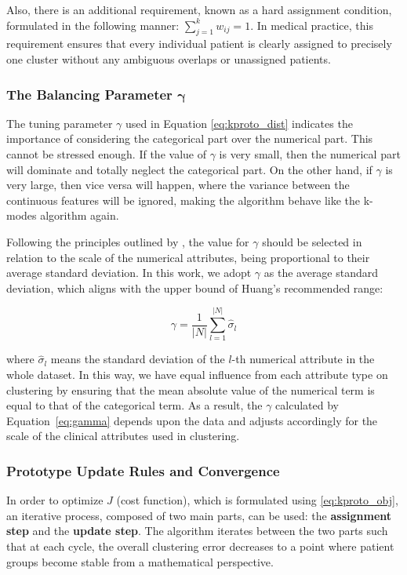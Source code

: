 Also, there is an additional requirement, known as a hard assignment condition, formulated in the following manner: $\sum_{j=1}^k w_{ij}=1$. In medical practice, this requirement ensures that every individual patient is clearly assigned to precisely one cluster without any ambiguous overlaps or unassigned patients.

\subsubsection*{The Balancing Parameter $\boldsymbol{\gamma}$}

The tuning parameter $\gamma$ used in Equation \ref{eq:kproto_dist} indicates the importance of considering the categorical part over the numerical part. This cannot be stressed enough. If the value of $\gamma$ is very small, then the numerical part will dominate and totally neglect the categorical part. On the other hand, if $\gamma$ is very large, then vice versa will happen, where the variance between the continuous features will be ignored, making the algorithm behave like the k-modes algorithm again.

Following the principles outlined by \cite{huang1998}, the value for $\gamma$ should be selected in relation to the scale of the numerical attributes, being proportional to their average standard deviation. In this work, we adopt $\gamma$ as the average standard deviation, which aligns with the upper bound of Huang's recommended range:

\begin{equation}
    \gamma = \frac{1}{|N|} \sum_{l=1}^{|N|} \hat{\sigma}_l
    \label{eq:gamma}
\end{equation}

where $\hat{\sigma}_l$ means the standard deviation of the $l$-th numerical attribute in the whole dataset. In this way, we have equal influence from each attribute type on clustering by ensuring that the mean absolute value of the numerical term is equal to that of the categorical term. As a result, the $\gamma$ calculated by Equation~\eqref{eq:gamma} depends upon the data and adjusts accordingly for the scale of the clinical attributes used in clustering.

\subsubsection*{Prototype Update Rules and Convergence}

In order to optimize $J$ (cost function), which is formulated using \eqref{eq:kproto_obj}, an iterative process, composed of two main parts, can be used: the \textbf{assignment step} and the \textbf{update step}. The algorithm iterates between the two parts such that at each cycle, the overall clustering error decreases to a point where patient groups become stable from a mathematical perspective.

